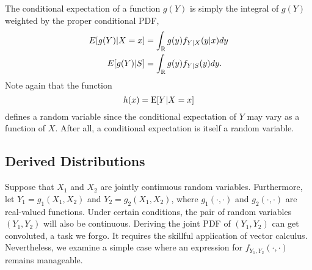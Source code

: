 The conditional expectation of a function $g(Y)$ is simply the integral of $g(Y)$ weighted by the proper conditional PDF,
\begin{align*}
E[g(Y) | X = x] &= \int_{\mathbb{R}} g(y) f_{Y|X} (y|x) dy \\
E[g(Y) | S] &= \int_{\mathbb{R}} g(y) f_{Y|S} (y) dy .
\end{align*}
Note again that the function
\begin{equation*}
h(x) = \mathrm{E} [Y | X=x]
\end{equation*}
defines a random variable since the conditional expectation of $Y$ may vary as a function of $X$.
After all, a conditional expectation is itself a random variable.



\subsection{Derived Distributions}

Suppose that $X_1$ and $X_2$ are jointly continuous random variables.
Furthermore, let $Y_1 = g_1 (X_1, X_2)$ and $Y_2 = g_2 (X_1, X_2)$, where $g_1 (\cdot, \cdot)$ and $g_2 (\cdot, \cdot)$ are real-valued functions.
Under certain conditions, the pair of random variables $(Y_1, Y_2)$ will also be continuous.
Deriving the joint PDF of $(Y_1, Y_2)$ can get convoluted, a task we forgo.
It requires the skillful application of vector calculus.
Nevertheless, we examine a simple case where an expression for $f_{Y_1, Y_2} (\cdot, \cdot)$ remains manageable.

